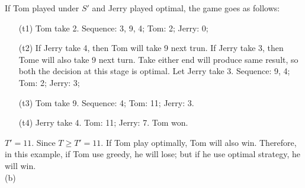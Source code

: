 \documentclass[10.5pt]{article}
\newenvironment{main idea}{\textbf{Main Idea: }}{}
\theoremstyle{remark}
\begin{document}
If Tom played under \(S'\) and Jerry played optimal, the game goes as follows:
\begin{enumerate}
	\item[(t1)] Tom take 2. Sequence: 3, 9, 4; Tom: 2; Jerry: 0;
	\item[(t2)] If Jerry take 4, then Tom will take 9 next trun. If Jerry take 3, then Tome will also take 9 next turn. Take either end will produce same result, so both the decision at this stage is optimal. Let Jerry take 3. Sequence: 9, 4; Tom: 2; Jerry: 3;
	\item[(t3)] Tom take 9. Sequence: 4; Tom: 11; Jerry: 3.
	\item[(t4)] Jerry take 4. Tom: 11; Jerry: 7. Tom won.
\end{enumerate}
\(T' = 11\). Since \(T \ge T' = 11\). If Tom play optimally, Tom will also win. Therefore, in this example, if Tom use greedy, he will lose; but if he use optimal strategy, he will win.\\
(b)\\
\end{document}
